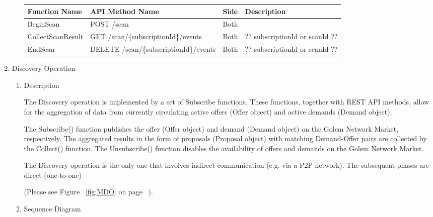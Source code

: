 \begin{enumerate}
\begin{enumerate}
\begin{table}[H]
\footnotesize

\begin{center}
\begin{tabular}{|p{3cm}|p{7cm}|p{1.5cm}|p{4cm}|} 
\hline
\rowcolor{lightgray}	Function Name	& API Method Name	& 	Side	&	Description \\
\hline

BeginScan 				& POST /scan								&	Both	&	\\
\hline

CollectScanResult		& GET /scan/\{subscriptionId\}/events		&	Both 	& ?? subscriptionId or scanId ??	\\
\hline

EndScan 				& DELETE /scan/\{subscriptionId\}/events	&	Both 	& ?? subscriptionId or scanId ??	\\
\hline

\end{tabular}
\end{center}
\end{table}

\end{enumerate}

\item  Discovery Operation

\begin{enumerate}

\item Description

The Discovery operation is implemented by a set of Subscribe functions. These functions, together with REST API methods, 
allow for the aggregation of data from currently circulating active offers (Offer object) and active demands (Demand object).

The Subscribe() function publishes the offer (Offer object) and demand (Demand object) on the Golem Network Market, respectively.
The aggregated results in the form of proposals (Proposal object) with matching Demand-Offer pairs are collected by the Collect() function.
The Unsubscribe() function disables the availability of offers and demands on the Golem Network Market.

The Discovery operation is the only one that involves indirect communication (e.g. via a P2P network).
The subsequent phases are direct (one-to-one)

(Please see Figure ~\ref{fig:MDO} on page ~\pageref{fig:MDO}).

\item Sequence Diagram


\end{enumerate}
\end{enumerate}
